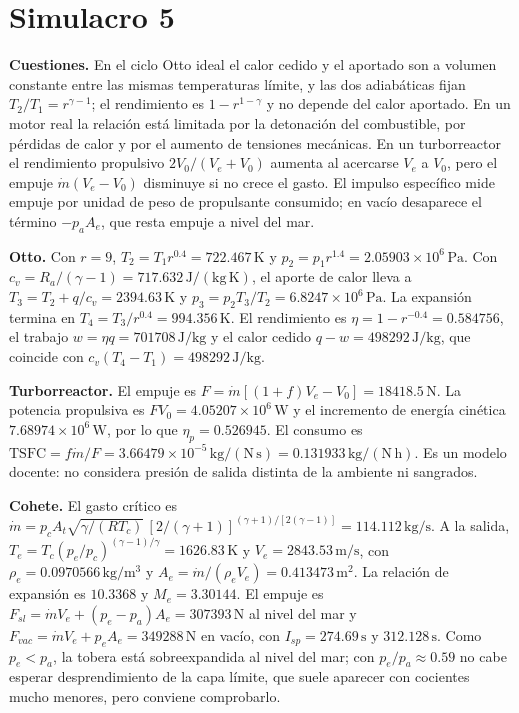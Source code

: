 

\section{Simulacro 5}
\textbf{Cuestiones.} En el ciclo Otto ideal el calor cedido y el aportado son a volumen constante entre las mismas temperaturas límite, y las dos adiabáticas fijan $T_2/T_1=r^{\gamma-1}$; el rendimiento es $1-r^{1-\gamma}$ y no depende del calor aportado. En un motor real la relación está limitada por la detonación del combustible, por pérdidas de calor y por el aumento de tensiones mecánicas. En un turborreactor el rendimiento propulsivo $2V_0/(V_e+V_0)$ aumenta al acercarse $V_e$ a $V_0$, pero el empuje $\dot m(V_e-V_0)$ disminuye si no crece el gasto. El impulso específico mide empuje por unidad de peso de propulsante consumido; en vacío desaparece el término $-p_aA_e$, que resta empuje a nivel del mar.

\textbf{Otto.} Con $r=9$, $T_2=T_1r^{0.4}=722.467\,\mathrm K$ y $p_2=p_1r^{1.4}=2.05903\times10^{6}\,\mathrm{Pa}$. Con $c_v=R_a/(\gamma-1)=717.632\,\mathrm{J/(kg\,K)}$, el aporte de calor lleva a $T_3=T_2+q/c_v=2394.63\,\mathrm K$ y $p_3=p_2T_3/T_2=6.8247\times10^{6}\,\mathrm{Pa}$. La expansión termina en $T_4=T_3/r^{0.4}=994.356\,\mathrm K$. El rendimiento es $\eta=1-r^{-0.4}=0.584756$, el trabajo $w=\eta q=701708\,\mathrm{J/kg}$ y el calor cedido $q-w=498292\,\mathrm{J/kg}$, que coincide con $c_v(T_4-T_1)=498292\,\mathrm{J/kg}$.

\textbf{Turborreactor.} El empuje es $F=\dot m[(1+f)V_e-V_0]=18418.5\,\mathrm N$. La potencia propulsiva es $FV_0=4.05207\times10^{6}\,\mathrm W$ y el incremento de energía cinética $7.68974\times10^{6}\,\mathrm W$, por lo que $\eta_p=0.526945$. El consumo es $\mathrm{TSFC}=f\dot m/F=3.66479\times10^{-5}\,\mathrm{kg/(N\,s)}=0.131933\,\mathrm{kg/(N\,h)}$. Es un modelo docente: no considera presión de salida distinta de la ambiente ni sangrados.

\textbf{Cohete.} El gasto crítico es $\dot m=p_cA_t\sqrt{\gamma/(RT_c)}\,[2/(\gamma+1)]^{(\gamma+1)/[2(\gamma-1)]}=114.112\,\mathrm{kg/s}$. A la salida, $T_e=T_c(p_e/p_c)^{(\gamma-1)/\gamma}=1626.83\,\mathrm K$ y $V_e=2843.53\,\mathrm{m/s}$, con $\rho_e=0.0970566\,\mathrm{kg/m^3}$ y $A_e=\dot m/(\rho_eV_e)=0.413473\,\mathrm{m^2}$. La relación de expansión es $10.3368$ y $M_e=3.30144$. El empuje es $F_{sl}=\dot mV_e+(p_e-p_a)A_e=307393\,\mathrm N$ al nivel del mar y $F_{vac}=\dot mV_e+p_eA_e=349288\,\mathrm N$ en vacío, con $I_{sp}=274.69\,\mathrm s$ y $312.128\,\mathrm s$. Como $p_e<p_a$, la tobera está sobreexpandida al nivel del mar; con $p_e/p_a\approx0.59$ no cabe esperar desprendimiento de la capa límite, que suele aparecer con cocientes mucho menores, pero conviene comprobarlo.

